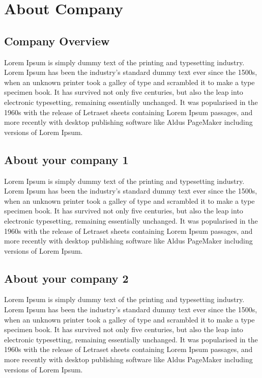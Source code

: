 \documentclass[12pt,a4paper]{report}
\begin{document}
\tableofcontents

\listoffigures


\bigbreak
\begingroup
\let\clearpage\relax
\listoftables
\endgroup

\chapter{About Company}
\section{Company Overview}
Lorem Ipsum is simply dummy text of the printing and typesetting industry. Lorem Ipsum has been the industry's standard dummy text ever since the 1500s, when an unknown printer took a galley of type and scrambled it to make a type specimen book. It has survived not only five centuries, but also the leap into electronic typesetting, remaining essentially unchanged. It was popularised in the 1960s with the release of Letraset sheets containing Lorem Ipsum passages, and more recently with desktop publishing software like Aldus PageMaker including versions of Lorem Ipsum. 
\section{About your company 1}
Lorem Ipsum is simply dummy text of the printing and typesetting industry. Lorem Ipsum has been the industry's standard dummy text ever since the 1500s, when an unknown printer took a galley of type and scrambled it to make a type specimen book. It has survived not only five centuries, but also the leap into electronic typesetting, remaining essentially unchanged. It was popularised in the 1960s with the release of Letraset sheets containing Lorem Ipsum passages, and more recently with desktop publishing software like Aldus PageMaker including versions of Lorem Ipsum.

\section{About your company 2}
Lorem Ipsum is simply dummy text of the printing and typesetting industry. Lorem Ipsum has been the industry's standard dummy text ever since the 1500s, when an unknown printer took a galley of type and scrambled it to make a type specimen book. It has survived not only five centuries, but also the leap into electronic typesetting, remaining essentially unchanged. It was popularised in the 1960s with the release of Letraset sheets containing Lorem Ipsum passages, and more recently with desktop publishing software like Aldus PageMaker including versions of Lorem Ipsum.
\end{document}

